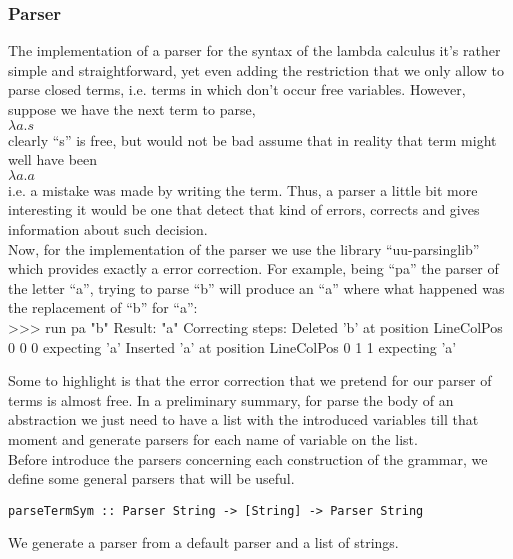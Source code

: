 \documentclass[a4paper,10pt]{article}
\newenvironment{code}{\footnotesize\verbatim}{\endverbatim\normalsize}
\begin{document}
\subsubsection{Parser}

The implementation of a parser for the syntax of the lambda calculus it's rather simple
and straightforward, yet even adding the restriction that we only allow to parse closed
terms, i.e. terms in which don't occur free variables.
However, suppose we have the next term to parse,\\

$\lambda a . s$\\

clearly ``s'' is free, but would not be bad assume that in reality that term might well
have been\\

$\lambda a . a$\\

i.e. a mistake was made by writing the term. Thus, a parser a little bit
more interesting it would be one that detect that kind of errors, corrects
and gives information about such decision.\\

Now, for the implementation of the parser we use the library ``uu-parsinglib''
which provides exactly a error correction. For example, being ``pa'' the parser
of the letter ``a'', trying to parse ``b'' will produce an ``a'' where what 
happened was the replacement of ``b'' for ``a'':\\

\begin{code}
 >>> run pa  "b"
     Result: "a"
     Correcting steps: 
       Deleted   'b' at position LineColPos 0 0 0 expecting 'a'
       Inserted  'a' at position LineColPos 0 1 1 expecting 'a'
\end{code}

Some to highlight is that the error correction that we pretend for our parser
of terms is almost free. In a preliminary summary, for parse the body of an 
abstraction we just need to have a list with the introduced variables till that
moment and generate parsers for each name of variable on the list.\\

Before introduce the parsers concerning each construction of the grammar, 
we define some general parsers that will be useful.

\begin{lstlisting}
parseTermSym :: Parser String -> [String] -> Parser String
\end{lstlisting}
We generate a parser from a default parser and a list of strings.
\end{document}
